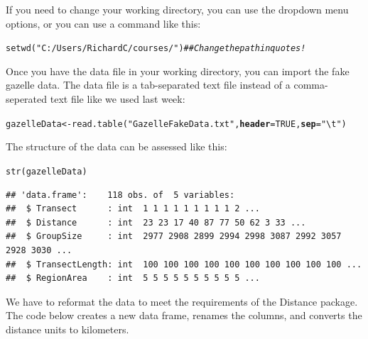 \documentclass[12pt]{article}\usepackage[]{graphicx}\usepackage[]{color}
\makeatletter
\newcommand{\hlnum}[1]{\textcolor[rgb]{0.69,0.494,0}{#1}}%
\newcommand{\hlstr}[1]{\textcolor[rgb]{0.749,0.012,0.012}{#1}}%
\newcommand{\hlcom}[1]{\textcolor[rgb]{0.514,0.506,0.514}{\textit{#1}}}%
\newcommand{\hlstd}[1]{\textcolor[rgb]{0,0,0}{#1}}%
\newcommand{\hlkwb}[1]{\textcolor[rgb]{0,0.341,0.682}{#1}}%
\newcommand{\hlkwc}[1]{\textcolor[rgb]{0,0,0}{\textbf{#1}}}%
\newcommand{\hlkwd}[1]{\textcolor[rgb]{0.004,0.004,0.506}{#1}}%
\newenvironment{kframe}{%
 \def\at@end@of@kframe{}%
 \ifinner\ifhmode%
  \def\at@end@of@kframe{\end{minipage}}%
  \begin{minipage}{\columnwidth}%
 \fi\fi%
 \def\FrameCommand##1{\hskip\@totalleftmargin \hskip-\fboxsep
 \colorbox{shadecolor}{##1}\hskip-\fboxsep
     \hskip-\linewidth \hskip-\@totalleftmargin \hskip\columnwidth}%
 \MakeFramed {\advance\hsize-\width
   \@totalleftmargin\z@ \linewidth\hsize
   \@setminipage}}%
 {\par\unskip\endMakeFramed%
 \at@end@of@kframe}
\newenvironment{knitrout}{}{} %
\makeatother
\begin{document}
If you need to change your working directory, you can use the dropdown
menu options, or you can use a command like this:

\begin{knitrout}
\color{fgcolor}\begin{kframe}
\begin{alltt}
\hlkwd{setwd}\hlstd{(}\hlstr{"C:/Users/RichardC/courses/"}\hlstd{)} \hlcom{## Change the path in quotes!}
\end{alltt}
\end{kframe}
\end{knitrout}

Once you have the data file in your working directory, you can import
the fake gazelle data. The data file is a tab-separated text file
instead of a comma-seperated text file like we used last week:

\begin{knitrout}
\color{fgcolor}\begin{kframe}
\begin{alltt}
\hlstd{gazelleData} \hlkwb{<-} \hlkwd{read.table}\hlstd{(}\hlstr{"GazelleFakeData.txt"}\hlstd{,} \hlkwc{header}\hlstd{=}\hlnum{TRUE}\hlstd{,} \hlkwc{sep}\hlstd{=}\hlstr{"\textbackslash{}t"}\hlstd{)}
\end{alltt}
\end{kframe}
\end{knitrout}

The structure of the data can be assessed like this:

\begin{knitrout}
\color{fgcolor}\begin{kframe}
\begin{alltt}
\hlkwd{str}\hlstd{(gazelleData)}
\end{alltt}
\begin{verbatim}
## 'data.frame':	118 obs. of  5 variables:
##  $ Transect      : int  1 1 1 1 1 1 1 1 1 2 ...
##  $ Distance      : int  23 23 17 40 87 77 50 62 3 33 ...
##  $ GroupSize     : int  2977 2908 2899 2994 2998 3087 2992 3057 2928 3030 ...
##  $ TransectLength: int  100 100 100 100 100 100 100 100 100 100 ...
##  $ RegionArea    : int  5 5 5 5 5 5 5 5 5 5 ...
\end{verbatim}
\end{kframe}
\end{knitrout}

We have to reformat the data to meet the requirements of the Distance
package. The code below creates a new data frame, renames the columns,
and converts the distance units to kilometers.
\end{document}
